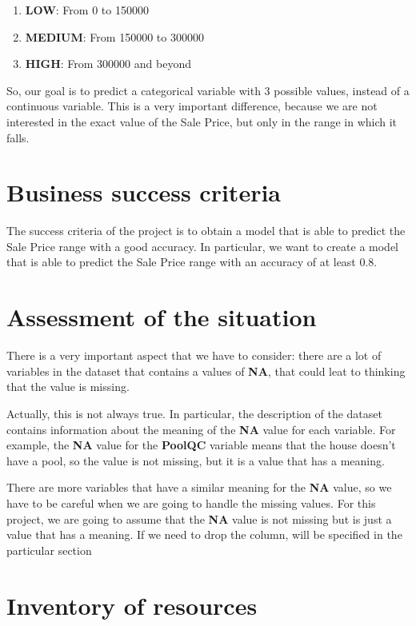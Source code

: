 \begin{enumerate}
    \item \textbf{LOW}: From 0 to 150000 
    \item \textbf{MEDIUM}: From 150000 to 300000 
    \item \textbf{HIGH}: From 300000 and beyond 
\end{enumerate}

So, our goal is to predict a categorical variable with 3 possible values, instead of a continuous variable. 
This is a very important difference, because we are not interested in the exact value of the Sale Price, but only in the range in which it falls.

\section{Business success criteria}
\label{subsec:business_success_criteria}
The success criteria of the project is to obtain a model that is able to predict the Sale Price range with a good accuracy. In particular, we want to create a model that is able to predict the Sale Price range with an accuracy of at least 0.8.

\section{Assessment of the situation}
\label{subsec:assessment_of_the_situation}

There is a very important aspect that we have to consider: there are a lot of variables in the dataset that contains a values of \textbf{NA}, that could leat to thinking that the value is missing.

Actually, this is not always true. In particular, the description of the dataset contains information about the meaning of the \textbf{NA} value for each variable. For example, the \textbf{NA} value for the \textbf{PoolQC} variable means that the house doesn't have a pool, so the value is not missing, but it is a value that has a meaning.

There are more variables that have a similar meaning for the \textbf{NA} value, so we have to be careful when we are going to handle the missing values. For this project, we are going to assume that the \textbf{NA} value is not missing but is just a value that has a meaning. If we need to drop the column, will be specified in the particular section

\section{Inventory of resources}
\label{subsec:inventory_of_resources}

